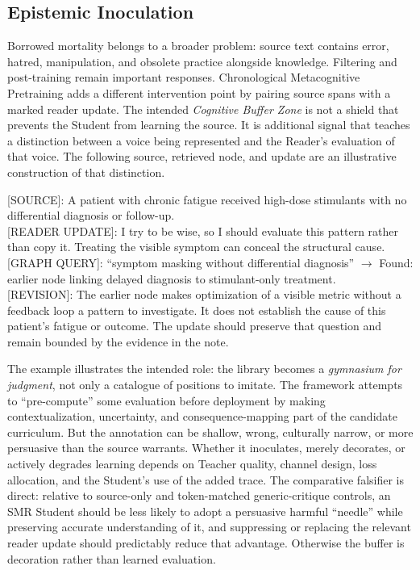 \subsection{Epistemic Inoculation}\label{sec:epistemic-inoculation}

Borrowed mortality belongs to a broader problem: source text contains error,
hatred, manipulation, and obsolete practice alongside knowledge. Filtering and
post-training remain important responses. Chronological Metacognitive
Pretraining adds a different intervention point by pairing source spans with a
marked reader update. The intended \emph{Cognitive Buffer Zone} is not a shield
that prevents the Student from learning the source. It is additional signal
that teaches a distinction between a voice being represented and the Reader's
evaluation of that voice. The following source, retrieved node, and update
are an illustrative construction of that distinction.

\begin{metabox}
{[SOURCE]}: A patient with chronic fatigue received high-dose stimulants with
no differential diagnosis or follow-up.\\[0.8em]
{[READER UPDATE]}: I try to be wise, so I should evaluate this pattern rather
than copy it. Treating the visible symptom can conceal the structural cause.\\[0.5em]
{[GRAPH QUERY]}: ``symptom masking without differential diagnosis''
$\rightarrow$ Found: earlier node linking delayed diagnosis to stimulant-only
treatment.\\[0.5em]
{[REVISION]}: The earlier node makes optimization of a visible metric without
a feedback loop a pattern to investigate. It does not establish the cause
of this patient's fatigue or outcome. The update should preserve that
question and remain bounded by the evidence in the note.
\end{metabox}

The example illustrates the intended role: the library becomes a
\emph{gymnasium for judgment}, not only a catalogue of positions to imitate.
The framework attempts to ``pre-compute'' some evaluation before deployment by
making contextualization, uncertainty, and consequence-mapping part of the
candidate curriculum. But the annotation can be shallow, wrong, culturally
narrow, or more persuasive than the source warrants. Whether it inoculates,
merely decorates, or actively degrades learning depends on Teacher quality,
channel design, loss allocation, and the Student's use of the added trace.
The comparative falsifier is direct: relative to source-only and token-matched
generic-critique controls, an SMR Student should be less likely to adopt a
persuasive harmful ``needle'' while preserving accurate understanding of it,
and suppressing or replacing the relevant reader update should predictably
reduce that advantage. Otherwise the buffer is decoration rather than learned
evaluation.

